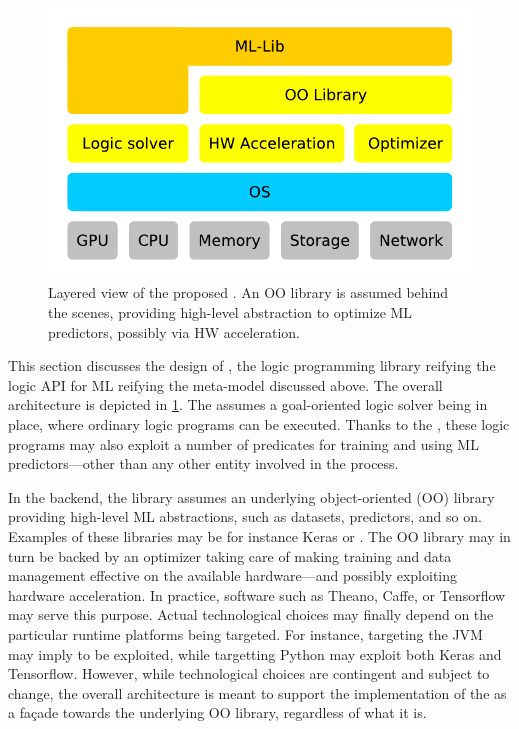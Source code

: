 \documentclass{article}
\begin{document}
\begin{figure}
    \centering
    \includegraphics[width=\linewidth]{figures/layers.pdf}
    \caption{Layered view of the proposed \mllib{}. An OO library is assumed behind the scenes, providing high-level abstraction to optimize ML predictors, possibly via HW acceleration.}
    \label{fig:layers}
\end{figure}

This section discusses the design of \mllib, the logic programming library reifying the logic API for ML reifying the meta-model discussed above.
%
The overall architecture is depicted in \cref{fig:layers}.
%
The \mllib{} assumes a goal-oriented logic solver being in place, where ordinary logic programs can be executed.
%
Thanks to the \mllib{}, these logic programs may also exploit a number of predicates for training and using ML predictors---other than any other entity involved in the process.

In the backend, the library assumes an underlying object-oriented (OO) library providing high-level ML abstractions, such as datasets, predictors, and so on.
%
Examples of these libraries may be for instance Keras \cite{chollet2015keras} or \deeplearningforj{} \cite{DL4J}.
%
The OO library may in turn be backed by an optimizer taking care of making training and data management effective on the available hardware---and possibly exploiting hardware acceleration.
%
In practice, software such as Theano, Caffe, or Tensorflow may serve this purpose.
%
Actual technological choices may finally depend on the particular runtime platforms being targeted.
%
For instance, targeting the JVM may imply \deeplearningforj{} to be exploited, while targetting Python may exploit both Keras and Tensorflow.
%
However, while technological choices are contingent and subject to change, the overall architecture is meant to support the implementation of the \mllib{} as a façade towards the underlying OO library, regardless of what it is.
\end{document}
